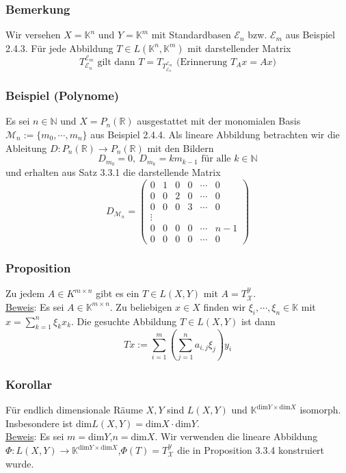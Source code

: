 \subsubsection{Bemerkung}
Wir versehen $X=\mathbb{K}^n$ und $Y=\mathbb{K}^m$ mit Standardbasen $\mathcal{E}_n$ bzw. $\mathcal{E}_m$ aus Beispiel 2.4.3.  Für jede Abbildung $T\in L(\mathbb{K}^n,\mathbb{K}^m)$ mit darstellender Matrix \[T^{\mathcal{E}_m}_{\mathcal{E}_n}\text{ gilt dann }T=T_{T_{\mathcal{E}_n}^{\mathcal{E}_m}}\text{ (Erinnerung }T_Ax=Ax)\]
\subsubsection{Beispiel (Polynome)}
Es sei $n\in \mathbb{N}$ und $X=P_n(\mathbb{R})$ ausgestattet mit der monomialen Basis $\mathcal{M}_n:=\{m_0,\cdots ,m_n\}$ aus Beispiel 2.4.4.  Als lineare Abbildung betrachten wir die Ableitung $D:P_n(\mathbb{R})\rightarrow P_n(\mathbb{R})$ mit den Bildern
\[D_{m_0}=0,\ D_{m_k}=km_{k-1}\text{ für alle }k\in \mathbb{N}\]
und erhalten aus Satz 3.3.1 die darstellende Matrix
\[ D_{\mathcal{M}_n}=\begin{pmatrix}0 & 1 & 0 & 0 &\cdots &0\\ 0 & 0& 2 & 0 &\cdots &0\\ 0& 0& 0& 3&\cdots &0\\ \vdots \\ 0 & 0& 0 &0 & \cdots & n-1\\ 0 & 0& 0 &0 & \cdots & 0\end{pmatrix}\]
\subsubsection{Proposition}
Zu jedem $A\in K^{m\times n}$ gibt es ein $T\in L(X,Y)$ mit $A=T_\mathcal{X}^\mathcal{Y}$.\\
\underline{Beweis}: Es sei $A\in \mathbb{K}^{m\times n}$.  Zu beliebigen $x\in X$ finden wir $\xi _i,\cdots ,\xi _n\in\mathbb{K}$ mit $x=\sum_{k=1}^n \xi _kx_k$.  Die gesuchte Abbildung $T\in L(X,Y)$ ist dann
\[Tx:=\sum_{i=1}^m\left(\sum_{j=1}^na_{i,j}\xi _j\right)y_i\]
\subsubsection{Korollar}
Für endlich dimensionale Räume $X,Y$ sind $L(X,Y)$ und $\mathbb{K}^{\mathrm{dim}Y\times \mathrm{dim}X}$ isomorph.  Insbesondere ist dim$L(X,Y)=$dim$X\cdot$dim$Y$.\\
\underline{Beweis}: Es sei $m=$dim$Y$,$n=$dim$X$.  Wir verwenden die lineare Abbildung $\Phi :L(X,Y)\rightarrow \mathbb{K}^{\mathrm{dim}Y\times \mathrm{dim}X}$,$\Phi (T)=T_\mathcal{X}^\mathcal{Y}$ die in Proposition 3.3.4 konstruiert wurde.
